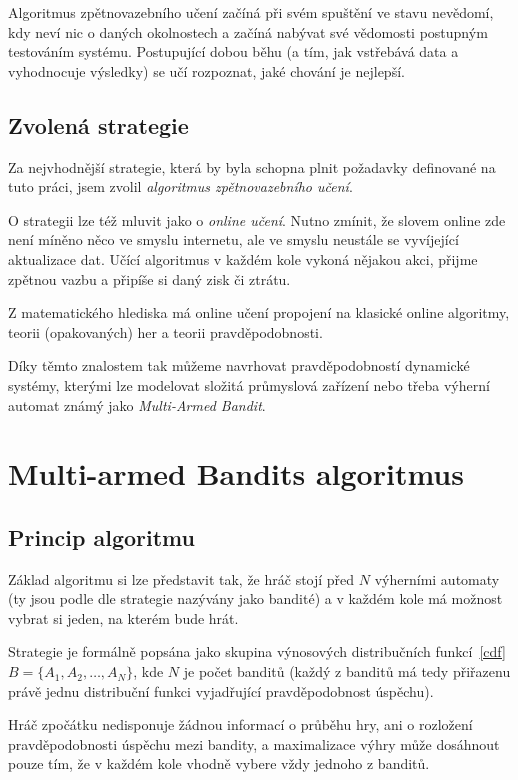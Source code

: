 \documentclass[thesis=M,czech]{FITthesis}[2014/05/07]
\begin{document}
Algoritmus zpětnovazebního učení začíná při svém spuštění ve stavu nevědomí, kdy neví nic o daných okolnostech a začíná nabývat své vědomosti postupným testováním systému. Postupující dobou běhu (a tím, jak vstřebává data a vyhodnocuje výsledky) se učí rozpoznat, jaké chování je nejlepší.

\subsection{Zvolená strategie}
\label{sub:online}
Za nejvhodnější strategie, která by byla schopna plnit požadavky definované na tuto práci, jsem zvolil \emph{algoritmus zpětnovazebního učení}.

O strategii lze též mluvit jako o \emph{online učení}. Nutno zmínit, že slovem online zde není míněno něco ve smyslu internetu, ale ve smyslu neustále se vyvíjející aktualizace dat. Učící algoritmus v každém kole vykoná nějakou akci, přijme zpětnou vazbu a připíše si daný zisk či ztrátu.

Z matematického hlediska má online učení propojení na klasické online algoritmy, teorii (opakovaných) her a teorii pravděpodobnosti.

Díky těmto znalostem tak můžeme navrhovat pravděpodobností dynamické systémy, kterými lze modelovat složitá průmyslová zařízení nebo třeba výherní automat známý jako \emph{Multi-Armed Bandit}.

\section{Multi-armed Bandits algoritmus}
\label{sec:multi}

\subsection{Princip algoritmu}
\cite{camdp} Základ algoritmu si lze představit tak, že hráč stojí před $N$ výherními automaty (ty jsou podle dle strategie nazývány jako bandité) a v každém kole má možnost vybrat si jeden, na kterém bude hrát.

Strategie je formálně popsána jako skupina výnosových distribučních funkcí~\ref{cdf} $B = \{ A_1, A_2, \ldots, A_N \}$, kde $N$ je počet banditů (každý z banditů má tedy přiřazenu právě jednu distribuční funkci vyjadřující pravděpodobnost úspěchu). 

Hráč zpočátku nedisponuje žádnou informací o průběhu hry, ani o rozložení pravděpodobnosti úspěchu mezi bandity, a maximalizace výhry může dosáhnout pouze tím, že v každém kole vhodně vybere vždy jednoho z banditů.
\end{document}
